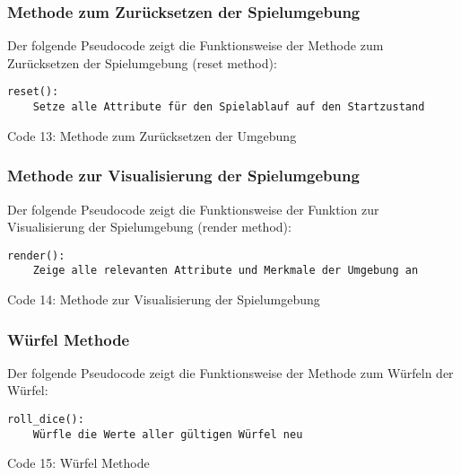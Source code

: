\subsubsection{Methode zum Zurücksetzen der Spielumgebung}
\begin{minipage}{\linewidth}
Der folgende Pseudocode zeigt die Funktionsweise der Methode zum Zurücksetzen der Spielumgebung (reset method):
\vspace{0.5cm}
\begin{lstlisting}
reset():
	Setze alle Attribute für den Spielablauf auf den Startzustand
\end{lstlisting}
Code 13: Methode zum Zurücksetzen der Umgebung\\
\end{minipage}

\subsubsection{Methode zur Visualisierung der Spielumgebung}
\begin{minipage}{\linewidth}
Der folgende Pseudocode zeigt die Funktionsweise der Funktion zur Visualisierung der Spielumgebung (render method):
\vspace{0.5cm}
\begin{lstlisting}
render():
	Zeige alle relevanten Attribute und Merkmale der Umgebung an
\end{lstlisting}
Code 14: Methode zur Visualisierung der Spielumgebung\\
\end{minipage}

\subsubsection{Würfel Methode}
\begin{minipage}{\linewidth}
Der folgende Pseudocode zeigt die Funktionsweise der Methode zum Würfeln der Würfel:
\vspace{0.5cm}
\begin{lstlisting}
roll_dice():
	Würfle die Werte aller gültigen Würfel neu
\end{lstlisting}
Code 15: Würfel Methode\\
\end{minipage}

